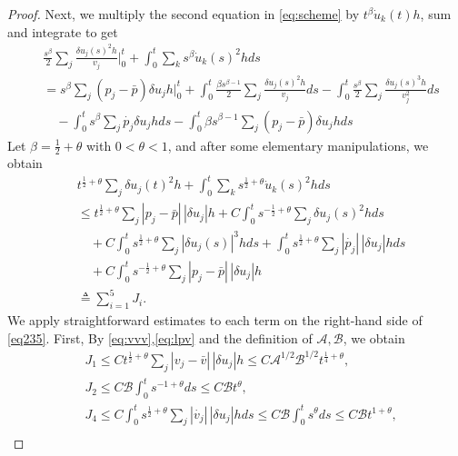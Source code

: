 \documentclass[10pt,a4paper]{amsart}
\begin{document}
\begin{proof}
Next, we multiply the second equation in \eqref{eq:scheme} by \(t^{\beta}\dot{u}_{k}(t)h\), sum and integrate to get
\begin{equation}\label{eq:t-beta}\begin{aligned}
		&\frac{s^{\beta}}{2}\sum_{j}\frac{\delta u_{j}(s)^{2}h}{v_j}\Big|_0^t+\int_{0}^{t}\sum_{k}s^{\beta}\dot{u}_{k}(s)^{2}hds \\&= s^{\beta}\sum_{j}(p_j-\bar p)\delta u_j h\Big|_0^t+\int_0^t\frac{\beta s^{\beta-1}}{2}\sum_{j}\frac{\delta u_{j}(s)^{2}h}{v_j}ds%
		-\int_0^t\frac{s^{\beta}}{2}\sum_{j}\frac{\delta u_{j}(s)^{3}h}{v_j^2}ds \\&
		\quad-\int_{0}^{t}s^{\beta}\sum_{j}\dot{p_j}\delta u_j hds-\int_{0}^{t}\beta s^{\beta-1}\sum_{j}(p_j-\bar p)\delta u_j hds
\end{aligned}\end{equation}
Let $\beta=\frac{1}{2}+\theta$ with \(0<\theta<1\), and after some elementary manipulations, we obtain
\begin{equation}\label{eq235}\begin{aligned}
&t^{\frac{1}{2}+\theta}\sum_{j}\delta u_{j}(t)^{2}h+\int_{0}^{t}\sum_{k}s^{\frac{1}{2}+\theta}\dot{u}_{k}(s)^{2}hds \\
&\leq t^{\frac{1}{2}+\theta}\sum_{j}|p_j-\bar p|\,|\delta u_j| h+C\int_0^ts^{-\frac{1}{2}+\theta}\sum_{j}\delta u_{j}(s)^{2}hds\\
&\quad		+C\int_0^ts^{\frac{1}{2}+\theta}\sum_{j}|\delta u_{j}(s)|^{3}hds +\int_{0}^{t}s^{\frac{1}{2}+\theta}\sum_{j}|\dot{p_j}|\,|\delta u_j| hds\\&\quad+C\int_{0}^{t}s^{-\frac{1}{2}+\theta}\sum_{j}|p_j-\bar p|\,|\delta u_j| h \\&\triangleq \sum_{i=1}^{5}J_i.
\end{aligned}\end{equation}
We apply straightforward estimates to each term on the right-hand side of \eqref{eq235}. First, By \eqref{eq:vvv},\eqref{eq:lpv} and the definition of $\mathscr{A},\mathscr{B}$, we obtain
\begin{align}
	&J_1\leq C t^{\frac{1}{2}+\theta}\sum_{j}|v_j-\bar v|\,|\delta u_j| h\leq C\mathscr{A}^{1/2}\mathscr{B}^{1/2}t^{\frac{1}{4}+\theta},\label{eq:ux-j1}\\
	&J_2\leq C\mathscr{B}\int_0^ts^{-1+\theta}ds\leq C\mathscr{B}t^\theta,\\
	&J_4\leq C\int_{0}^{t}s^{\frac{1}{2}+\theta}\sum_{j}|\dot{v_j}|\,|\delta u_j| hds\leq C\mathscr{B}\int_0^ts^{\theta}ds\leq C\mathscr{B}t^{1+\theta},\\

\end{align}
\end{proof}
\end{document}
